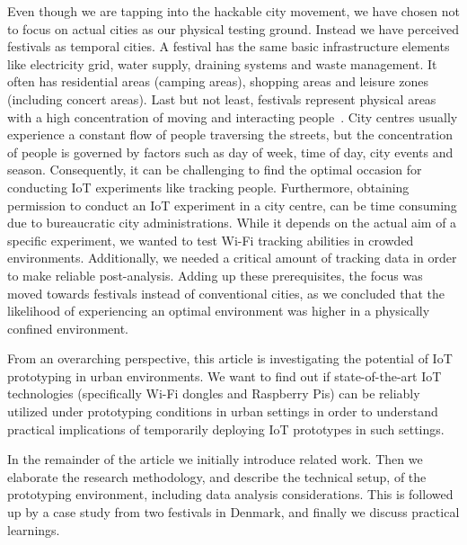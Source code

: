 Even though we are tapping into the hackable city movement, we have chosen not to focus on actual cities as our physical testing ground. Instead we have perceived festivals as temporal cities. A festival has the same basic infrastructure elements like electricity grid, water supply, draining systems and waste management. It often has residential areas (camping areas), shopping areas and leisure zones (including concert areas). Last but not least, festivals represent physical areas with a high concentration of moving and interacting people~\cite{Jarvis:2013:USW:2494091.2499216}. City centres usually experience a constant flow of people traversing the streets, but the concentration of people is governed by factors such as day of week, time of day, city events and season. Consequently, it can be challenging to find the optimal occasion for conducting IoT experiments like tracking people. Furthermore, obtaining permission to conduct an IoT experiment in a city centre, can be time consuming due to bureaucratic city administrations. While it depends on the actual aim of a specific experiment, we wanted to test Wi-Fi tracking abilities in crowded environments. Additionally, we needed a critical amount of tracking data in order to make reliable post-analysis. Adding up these prerequisites, the focus was moved towards festivals instead of conventional cities, as we concluded that the likelihood of experiencing an optimal environment was higher in a physically confined environment.

From an overarching perspective, this article is investigating the potential of IoT prototyping in urban environments. We want to find out if state-of-the-art IoT technologies (specifically Wi-Fi dongles and Raspberry Pis) can be reliably utilized under prototyping conditions in urban settings in order to understand practical implications of temporarily deploying IoT prototypes in such settings.

In the remainder of the article we initially introduce related work. Then we elaborate the research methodology, and describe the technical setup, of the prototyping environment, including data analysis considerations. This is followed up by a case study from two festivals in Denmark, and finally we discuss practical learnings.